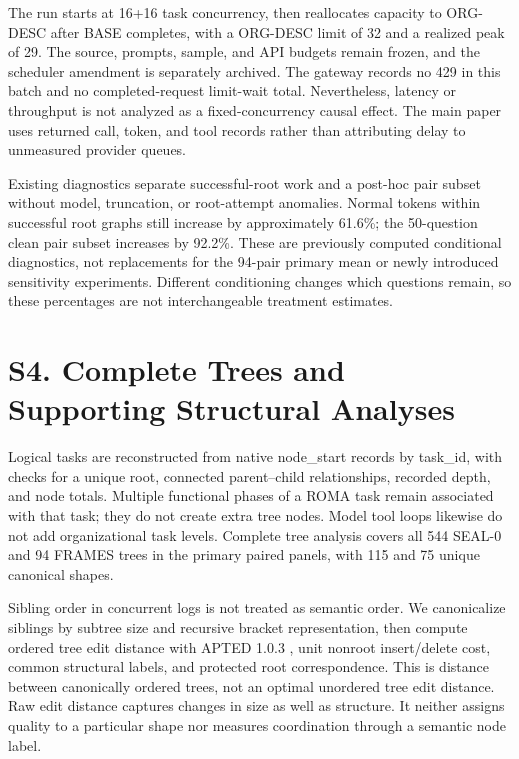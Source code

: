 \documentclass[10pt,letterpaper,twocolumn]{article}
\begin{document}
The run starts at 16+16 task concurrency, then reallocates capacity to ORG-DESC after BASE completes, with a ORG-DESC limit of 32 and a realized peak of 29. The source, prompts, sample, and API budgets remain frozen, and the scheduler amendment is separately archived. The gateway records no 429 in this batch and no completed-request limit-wait total. Nevertheless, latency or throughput is not analyzed as a fixed-concurrency causal effect. The main paper uses returned call, token, and tool records rather than attributing delay to unmeasured provider queues.


Existing diagnostics separate successful-root work and a post-hoc pair subset without model, truncation, or root-attempt anomalies. Normal tokens within successful root graphs still increase by approximately 61.6\%; the 50-question clean pair subset increases by 92.2\%. These are previously computed conditional diagnostics, not replacements for the 94-pair primary mean or newly introduced sensitivity experiments. Different conditioning changes which questions remain, so these percentages are not interchangeable treatment estimates.


\section*{S4. Complete Trees and Supporting Structural Analyses}

Logical tasks are reconstructed from native node\_start records by task\_id, with checks for a unique root, connected parent--child relationships, recorded depth, and node totals. Multiple functional phases of a ROMA task remain associated with that task; they do not create extra tree nodes. Model tool loops likewise do not add organizational task levels. Complete tree analysis covers all 544 SEAL-0 and 94 FRAMES trees in the primary paired panels, with 115 and 75 unique canonical shapes.


Sibling order in concurrent logs is not treated as semantic order. We canonicalize siblings by subtree size and recursive bracket representation, then compute ordered tree edit distance with APTED 1.0.3 \cite{apted}, unit nonroot insert/delete cost, common structural labels, and protected root correspondence. This is distance between canonically ordered trees, not an optimal unordered tree edit distance. Raw edit distance captures changes in size as well as structure. It neither assigns quality to a particular shape nor measures coordination through a semantic node label.
\end{document}
